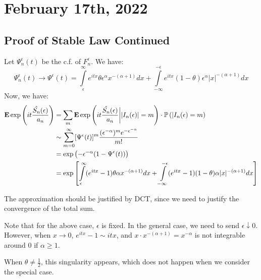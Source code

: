 \documentclass[../main/main.tex]{subfiles}
\begin{document}
\section{February 17th, 2022}
\subsection{Proof of Stable Law Continued}
Let $\Psi_n ^{\epsilon}(t)$ be the c.f. of $F_n^{\epsilon}$. We have:
\[
	\Psi_n^{\epsilon}(t) \to \Psi^{\epsilon}(t) = \int\limits_{\epsilon}^{\infty} e^{itx}\theta \epsilon^{\alpha} x^{-(\alpha + 1)} dx + \int\limits_{-\infty}^{-\epsilon} e^{itx}(1-\theta) \epsilon^{\alpha}|x|^{-(\alpha+1)}dx
\]
Now, we have:
\begin{align*}
	\text{\textbf{E}} \exp \left( it \frac{\hat{S_n}(\epsilon)}{a_n} \right) & = \sum\limits_m \text{\textbf{E}} \exp \left( it \frac{\hat{S_n}(\epsilon)}{a_n} \bigg\rvert |I_n(\epsilon)| = m\right) \cdot \mathbb{P} \left( |I_n(\epsilon) = m \right)                                \\
	                                                          & \sim \sum\limits_{m=0}^{\infty}[\Psi^{\epsilon}(t)]^{m} \frac{(\epsilon^{-\alpha})^{m}e^{-\epsilon^{-\alpha}}}{m!}                                                                  \\
	                                                          & = \exp \left( -\epsilon^{-\alpha}(1-\Psi^{\epsilon}(t)) \right)                                                                                                                     \\
	                                                          & = \exp \left[ \int\limits_{\epsilon}^{\infty} (e^{itx}-1) \theta \alpha x^{-(\alpha+1)}dx + \int\limits_{-\infty}^{-\epsilon}(e^{itx}-1)(1-\theta)\alpha|x|^{-(\alpha+1)}dx \right]
\end{align*}
\begin{remark}
	The approximation should be justified by DCT, since we need to justify the convergence of the total sum.
\end{remark}
Note that for the above case, $\epsilon$ is fixed. In the general case, we need to send $\epsilon \downarrow 0$. However, when $x \to 0$, $e^{itx} - 1 \sim itx$, and $x \cdot x^{-(\alpha+1)} = x^{-\alpha}$ is not integrable around 0 if $\alpha \geq 1$.

\begin{remark}
	When $\theta \neq \frac{1}{2}$, this singularity appears, which does not happen when we consider the special case.
\end{remark}
\end{document}

